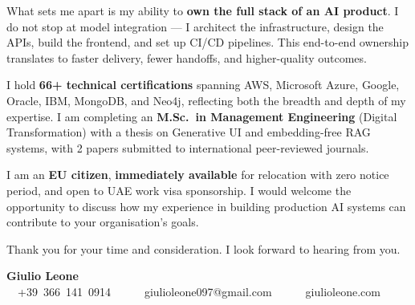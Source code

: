 \documentclass[11pt,a4paper,sans]{moderncv}
\begin{document}
\vspace{0.5em}

What sets me apart is my ability to \textbf{own the full stack of an AI product}. I do not stop at model integration --- I architect the infrastructure, design the APIs, build the frontend, and set up CI/CD pipelines. This end-to-end ownership translates to faster delivery, fewer handoffs, and higher-quality outcomes.

\vspace{0.5em}

I hold \textbf{66+ technical certifications} spanning AWS, Microsoft Azure, Google, Oracle, IBM, MongoDB, and Neo4j, reflecting both the breadth and depth of my expertise. I am completing an \textbf{M.Sc.\ in Management Engineering} (Digital Transformation) with a thesis on Generative UI and embedding-free RAG systems, with 2 papers submitted to international peer-reviewed journals.

\vspace{0.5em}

I am an \textbf{EU citizen}, \textbf{immediately available} for relocation with zero notice period, and open to UAE work visa sponsorship. I would welcome the opportunity to discuss how my experience in building production AI systems can contribute to your organisation's goals.

\vspace{0.8em}

Thank you for your time and consideration. I look forward to hearing from you.

\vspace{1.2em}

\textbf{Giulio Leone}\\
\faPhone~~+39~366~141~0914~~\textbar~~\faEnvelope~~giulioleone097@gmail.com~~\textbar~~\faGlobe~~giulioleone.com
\end{document}
